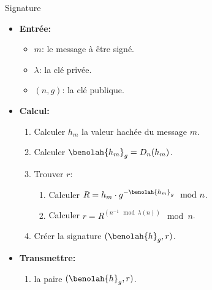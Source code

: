 	\begin{algo}{Signature}
		\begin{itemize}\renewcommand{\labelitemi}{} \renewcommand{\labelitemii}{$\cdot$}
			\item{\bf Entrée:} 
				\begin{itemize}
					\item $m$: le message à être signé.
					\item $\lambda$: la clé privée. 
					\item $(n,g)$: la clé publique.
				\end{itemize}
			\item{\bf Calcul:}
				\begin{enumerate} %
				\renewcommand{\theenumi}{\arabic{enumi}}
				\renewcommand{\theenumii}{\arabic{enumii}}
				\renewcommand{\theenumiii}{\arabic{enumiii}}
				\renewcommand{\labelenumi}{\theenumi.}
				\renewcommand{\labelenumii}{\theenumi.\theenumii.}
				\renewcommand{\labelenumiii}{\theenumi.\theenumii.\theenumiii.}
				\makeatletter
				\renewcommand{\p@enumii}{\theenumi.}
				\renewcommand{\p@enumiii}{\theenumi.\theenumii.}
				\makeatother

					\item Calculer $h_m$ la valeur hachée du message $m$.
					\item Calculer $\benolah{h_m}_g = D_n(h_m)$.
					\item Trouver $r$:
					\begin{enumerate}
						\item Calculer $R =  h_m\cdot g^{-\benolah{h_m}_g}\mod{n}$.\label{item:calcR}
						\item Calculer $r = R^{(n^{-1}\mod{\lambda(n)})}\mod{n}$.
					\end{enumerate}
					\item Créer la signature $(\benolah{h}_g,r)$.
				\end{enumerate}
			\item{\bf Transmettre:}
				\begin{enumerate}[]
				\item la paire $(\benolah{h}_g,r)$.
				\end{enumerate}

		\end{itemize}
	\end{algo}


